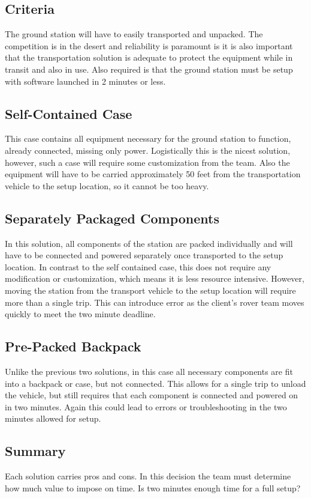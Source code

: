 \documentclass[onecolumn, draftclsnofoot, 10pt, compsoc]{IEEEtran}
\begin{document}
\subsection{Criteria}
The ground station will have to easily transported and unpacked.
The competition is in the desert and reliability is paramount is it is also important that the transportation solution is adequate to protect the equipment while in transit and also in use.
Also required is that the ground station must be setup with software launched in 2 minutes or less.

\subsection{Self-Contained Case}
This case contains all equipment necessary for the ground station to function, already connected, missing only power.
Logistically this is the nicest solution, however, such a case will require some customization from the team.
Also the equipment will have to be carried approximately 50 feet from the transportation vehicle to the setup location, so it cannot be too heavy.

\subsection{Separately Packaged Components}
In this solution, all components of the station are packed individually and will have to be connected and powered separately once transported to the setup location.
In contrast to the self contained case, this does not require any modification or customization, which means it is less resource intensive.
However, moving the station from the transport vehicle to the setup location will require more than a single trip.
This can introduce error as the client's rover team moves quickly to meet the two minute deadline.

\subsection{Pre-Packed Backpack}
Unlike the previous two solutions, in this case all necessary components are fit into a backpack or case, but not connected.
This allows for a single trip to unload the vehicle, but still requires that each component is connected and powered on in two minutes.
Again this could lead to errors or troubleshooting in the two minutes allowed for setup.

\subsection{Summary}
Each solution carries pros and cons.
In this decision the team must determine how much value to impose on time.
Is two minutes enough time for a full setup?
\end{document}
